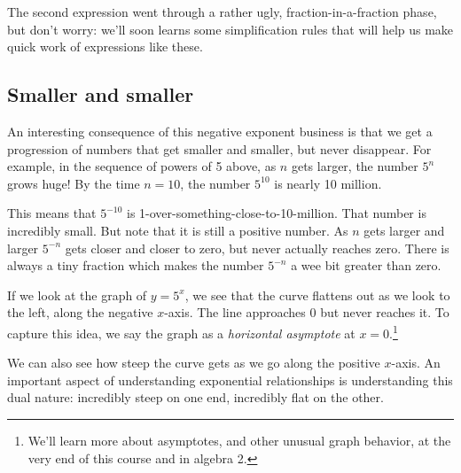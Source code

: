 The second expression went through a rather ugly, fraction-in-a-fraction phase, but don't worry: we'll soon learns some simplification rules that will help us make quick work of expressions like these.

\subsection{Smaller and smaller}

An interesting consequence of this negative exponent business is that we get a progression of numbers that get smaller and smaller, but never disappear. For example, in the sequence of powers of 5 above, as $n$ gets larger, the number $5^n$ grows huge! By the time $n=10$, the number $5^{10}$ is nearly 10 million.

This means that $5^{-10}$ is 1-over-something-close-to-10-million. That number is incredibly small. But note that it is still a positive number. As $n$ gets larger and larger $5^{-n}$ gets closer and closer to zero, but never actually reaches zero. There is always a tiny fraction which makes the number $5^{-n}$ a wee bit greater than zero.

If we look at the graph of $y=5^x$, we see that the curve flattens out as we look to the left, along the negative $x$-axis. The line approaches 0 but never reaches it. To capture this idea, we say the graph as a \textit{horizontal asymptote} at $x=0$.\footnote{We'll learn more about asymptotes, and other unusual graph behavior, at the very end of this course and in algebra 2.}

\begin{center}
\end{center}

We can also see how steep the curve gets as we go along the positive $x$-axis. An important aspect of understanding exponential relationships is understanding this dual nature: incredibly steep on one end, incredibly flat on the other.

